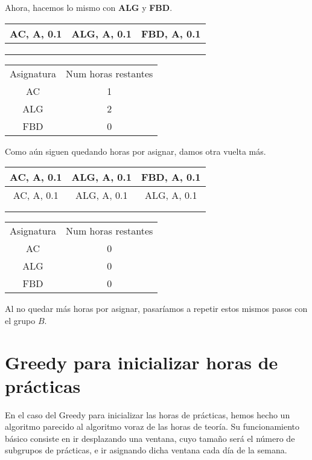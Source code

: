 Ahora, hacemos lo mismo con \textbf{ALG} y \textbf{FBD}.

\begin{minipage}{0.5\textwidth}    
\begin{tabular}{| c | c | c |}
\hline
AC, A, 0.1 & ALG, A, 0.1  & FBD, A, 0.1 \\
 \hline
 &  &  \\
 \hline
 &  &  \\
 \hline
 &  &  \\
 \hline 
\end{tabular}
\end{minipage}
\begin{minipage}{0.5\textwidth}
\begin{tabular}{c | c}
Asignatura & Num horas restantes \\
AC & 1 \\
ALG & 2 \\
FBD & 0
\end{tabular}
\end{minipage}

Como aún siguen quedando horas por asignar, damos otra vuelta más.

\begin{minipage}{0.5\textwidth}    
\begin{tabular}{| c | c | c |}
\hline
AC, A, 0.1 & ALG, A, 0.1  & FBD, A, 0.1 \\
 \hline
AC, A, 0.1 & ALG, A, 0.1 & ALG, A, 0.1  \\
 \hline
 &  &  \\
 \hline
 &  &  \\
 \hline 
\end{tabular}
\end{minipage}
\begin{minipage}{0.5\textwidth}
\begin{tabular}{c | c}
Asignatura & Num horas restantes \\
AC & 0 \\
ALG & 0 \\
FBD & 0
\end{tabular}
\end{minipage}

Al no quedar más horas por asignar, pasaríamos a repetir estos mismos pasos con el grupo $B$.

\section{Greedy para inicializar horas de prácticas}
En el caso del Greedy para inicializar las horas de prácticas, hemos hecho un algoritmo parecido al algoritmo voraz de las horas de teoría. Su funcionamiento básico consiste en ir desplazando una ventana, cuyo tamaño será el número de subgrupos de prácticas, e ir asignando dicha ventana cada día de la semana.

